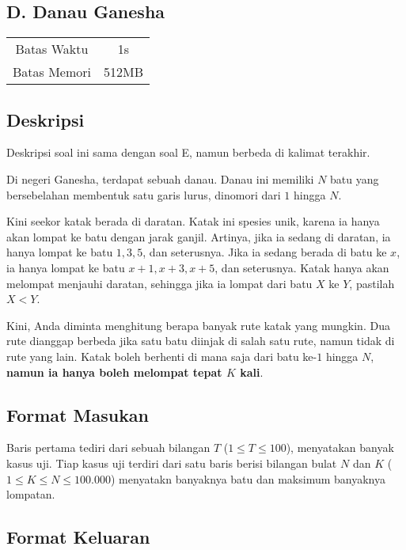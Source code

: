 \documentclass{article}
\begin{document}
\begin{center}
    \section*{D. Danau Ganesha}

    \begin{tabular}{ | c c | }
        \hline
        Batas Waktu  & 1s \\
        Batas Memori & 512MB \\
        \hline
    \end{tabular}
\end{center}

\subsection*{Deskripsi}

Deskripsi soal ini sama dengan soal E, namun berbeda di kalimat terakhir.

Di negeri Ganesha, terdapat sebuah danau.
Danau ini memiliki $N$ batu yang bersebelahan membentuk satu garis lurus, dinomori dari $1$ hingga $N$.

Kini seekor katak berada di daratan.
Katak ini spesies unik, karena ia hanya akan lompat ke batu dengan jarak ganjil.
Artinya, jika ia sedang di daratan, ia hanya lompat ke batu $1, 3, 5$, dan seterusnya.
Jika ia sedang berada di batu ke $x$, ia hanya lompat ke batu $x+1, x+3, x+5$, dan seterusnya.
Katak hanya akan melompat menjauhi daratan, sehingga jika ia lompat dari batu $X$ ke $Y$, pastilah $X < Y$.

Kini, Anda diminta menghitung berapa banyak rute katak yang mungkin.
Dua rute dianggap berbeda jika satu batu diinjak di salah satu rute, namun tidak di rute yang lain.
Katak boleh berhenti di mana saja dari batu ke-$1$ hingga $N$, \textbf{namun ia hanya boleh melompat tepat $K$ kali}.

\subsection*{Format Masukan}

Baris pertama tediri dari sebuah bilangan $T$ ($1 \leq T \leq 100$), menyatakan banyak kasus uji.
Tiap kasus uji terdiri dari satu baris berisi bilangan bulat $N$ dan $K$ ($1 \leq K \leq N \leq 100.000$) menyatakn banyaknya batu dan maksimum banyaknya lompatan.

\subsection*{Format Keluaran}
\end{document}
